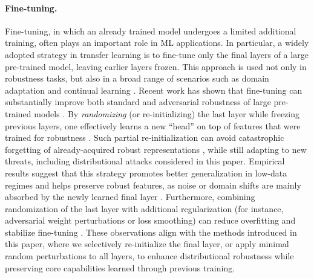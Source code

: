 \paragraph{Fine-tuning.} \label{subsec:finetuning-litreview}
Fine-tuning, in which an already trained model undergoes a limited additional training, often plays an important role in ML applications. 
In particular, a widely adopted strategy in transfer learning is to fine-tune only the final layers of a large pre-trained model, leaving earlier layers frozen. This approach is used not only in robustness tasks, but also in a broad range of scenarios such as domain adaptation \citep{DBLP:conf/cvpr/TzengHSD17} and continual learning \citep{DBLP:journals/nn/ParisiKPKW19}.
Recent work has shown that fine-tuning can substantially improve both standard and adversarial robustness of large pre-trained models \citep{yosinski2014transferable,raghu2019transfusion}. 
By \emph{randomizing} (or re-initializing) the last layer while freezing previous layers, one effectively learns a new ``head'' on top of features that were trained for robustness \citep{kornblith2019better}. 
Such partial re-initialization can avoid catastrophic forgetting of already-acquired robust representations \citep{DBLP:conf/eccv/LiH16}, while still adapting to new threats, including distributional attacks considered in this paper. 
Empirical results suggest that this strategy promotes better generalization in low-data regimes and helps preserve robust features, as noise or domain shifts are mainly absorbed by the newly learned final layer \citep{DBLP:conf/acl/RuderH18}. Furthermore, combining randomization of the last layer with additional regularization (for instance, adversarial weight perturbations or loss smoothing) can reduce overfitting and stabilize fine-tuning \citep{SWMJ20}. 
These observations align with the methods introduced in this paper, where we selectively re-initialize the final layer, or apply minimal random perturbations to all layers, to enhance distributional robustness while preserving core capabilities learned through previous training.